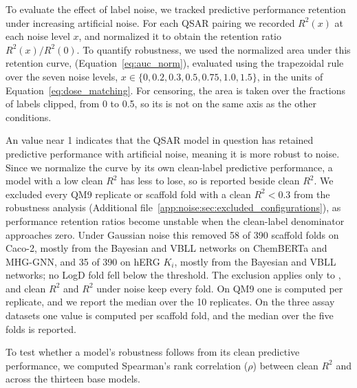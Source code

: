 To evaluate the effect of label noise, we tracked predictive performance retention under increasing artificial noise. For each QSAR pairing we recorded $R^2(x)$ at each noise level $x$, and normalized it to obtain the retention ratio $R^2(x)/R^2(0)$. To quantify robustness, we used the normalized area under this retention curve, \aucnorm{} (Equation~\ref{eq:auc_norm}), evaluated using the trapezoidal rule over the seven noise levels, $x \in \{0, 0.2, 0.3, 0.5, 0.75, 1.0, 1.5\}$, in the units of Equation~\ref{eq:dose_matching}. For censoring, the area is taken over the fractions of labels clipped, from 0 to 0.5, so its \aucnorm{} is not on the same axis as the other conditions.

An \aucnorm{} value near 1 indicates that the QSAR model in question has retained predictive performance with artificial noise, meaning it is more robust to noise. Since we normalize the curve by its own clean-label predictive performance, a model with a low clean $R^2$ has less to lose, so \aucnorm{} is reported beside clean $R^2$. We excluded every QM9 replicate or scaffold fold with a clean $R^2 < 0.3$ from the robustness analysis (Additional file~\ref{app:noise:sec:excluded_configurations}), as performance retention ratios become unstable when the clean-label denominator approaches zero. Under Gaussian noise this removed 58 of 390 scaffold folds on Caco-2, mostly from the Bayesian and VBLL networks on ChemBERTa and MHG-GNN, and 35 of 390 on hERG $K_i$, mostly from the Bayesian and VBLL networks; no LogD fold fell below the threshold. The exclusion applies only to \aucnorm{}, and clean $R^2$ and $R^2$ under noise keep every fold. On QM9 one \aucnorm{} is computed per replicate, and we report the median over the 10 replicates. On the three assay datasets one value is computed per scaffold fold, and the median over the five folds is reported. 

To test whether a model's robustness follows from its clean predictive performance, we computed Spearman's rank correlation ($\rho$) between clean $R^2$ and \aucnorm{} across the thirteen base models.

